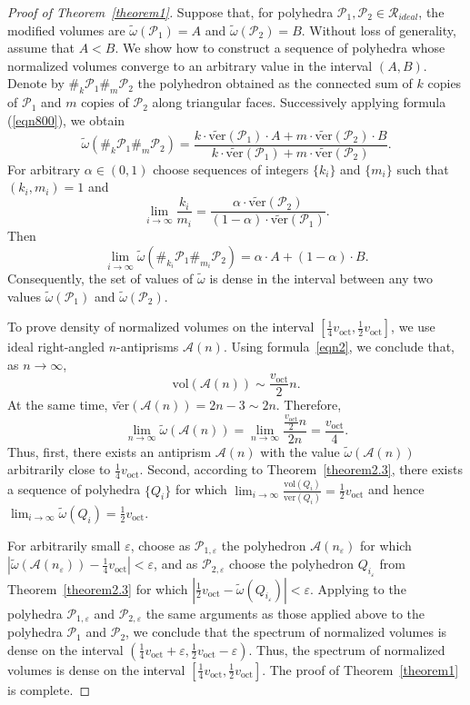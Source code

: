 \documentclass{amsart}
\newcommand{\vol}{\mathrm{vol}}
\newcommand{\tomega}{\widetilde{\omega}}
\newcommand{\tN}{\widetilde{\ver}}
\newcommand{\voct}{v_{\mathrm{oct}}}
\newcommand{\ver}{\mathrm{ver}}
\begin{document}
\begin{proof}[Proof of Theorem~\ref{theorem1}]
		Suppose that, for polyhedra $\mathcal P_1, \mathcal P_2 \in \mathcal R_{ideal}$, the modified volumes are $\tomega(\mathcal P_1) = A$ and $\tomega(\mathcal P_2) = B$.
		Without loss of generality, assume that $A < B$.
		We show how to construct a sequence of polyhedra whose normalized volumes converge to an arbitrary value in the interval $(A, B)$.
	Denote by $\#_k \mathcal P_1 \#_m \mathcal P_2$ the polyhedron obtained as the connected sum of $k$ copies of $\mathcal P_1$ and $m$ copies of $\mathcal P_2$ along triangular faces.
	Successively applying formula (\ref{eqn800}), we obtain
	$$
	\tomega(\#_k \mathcal P_1 \#_m \mathcal P_2) = \frac{k \cdot \tN(\mathcal P_1) \cdot A + m \cdot \tN(\mathcal P_2) \cdot B}{k \cdot \tN(\mathcal P_1) + m \cdot \tN(\mathcal P_2)}.
	$$
	For arbitrary $\alpha \in (0,1)$ choose sequences of integers $\{k_i\}$ and $\{m_i\}$ such that $(k_i, m_i)=1$ and 
	$$
	\lim_{i \to \infty}  \frac{k_i}{ m_i}   = \frac{\alpha \cdot \tN(\mathcal P_2)}{(1-\alpha) \cdot \tN(\mathcal P_1)}.
	$$ 
	Then 
	$$
	\lim_{i \to \infty} \tomega(\#_{k_i} \mathcal P_1 \#_{m_i} \mathcal P_2) = \alpha \cdot A + (1-\alpha) \cdot B.
	$$
	Consequently, the set of values of $\tomega$ is dense in the interval between any two values $\tomega(\mathcal P_1)$ and $\tomega(\mathcal P_2)$.

	To prove density of normalized volumes on the interval $\left[ \frac{1}{4} \voct, \frac{1}{2} \voct \right]$, we use ideal right-angled $n$-antiprisms $\mathcal A(n)$.
		Using formula~\eqref{eqn2}, we conclude that, as $n \to \infty$,
	$$
	\vol(\mathcal A(n)) \sim \frac{\voct}{2} n.
	$$
	At the same time, $\tN(\mathcal A(n)) = 2n - 3 \sim 2n$.
		Therefore,
	$$
	\lim_{n \to \infty} \tomega(\mathcal A(n)) = \lim_{n \to \infty} \frac{\frac{\voct}{2} n}{2n} = \frac{\voct}{4}.
	$$
	Thus, first, there exists an antiprism $\mathcal A(n)$ with the value $\tomega(\mathcal A(n))$ arbitrarily close to $\frac{1}{4} \voct$.
		Second, according to Theorem~\ref{theorem2.3}, there exists a sequence of polyhedra $\{Q_i\}$ for which $\lim_{i\to \infty} \frac{\vol(Q_i)}{\ver(Q_i)} = \frac{1}{2} \voct$ and hence $\lim_{i\to \infty} \tomega(Q_i) = \frac{1}{2} \voct$.

		For arbitrarily small $\varepsilon$, choose as $\mathcal P_{1, \varepsilon}$ the polyhedron $\mathcal A(n_{\varepsilon})$ for which $|
	\tomega(\mathcal A(n_{\varepsilon})) - \frac{1}{4}\voct | < \varepsilon$, and as $\mathcal P_{2, \varepsilon}$ choose the polyhedron $Q_{i_\varepsilon}$ from Theorem~\ref{theorem2.3} for which $|
		\frac{1}{2} \voct - \tomega(Q_{i_\varepsilon})| < \varepsilon$. Applying to the polyhedra $\mathcal P_{1, \varepsilon}$ and $\mathcal P_{2, \varepsilon}$ the same arguments as those applied above to the polyhedra $\mathcal P_1$ and $\mathcal P_2$, we conclude that the spectrum of normalized volumes is dense on the interval $\left(\frac{1}{4}\voct + \varepsilon, \frac{1}{2} \voct - \varepsilon \right)$.
		Thus, the spectrum of normalized volumes is dense on the interval $\left[ \frac{1}{4} \voct, \frac{1}{2} \voct \right]$. The proof of Theorem~\ref{theorem1} is complete.
\end{proof}
	
\end{document}
